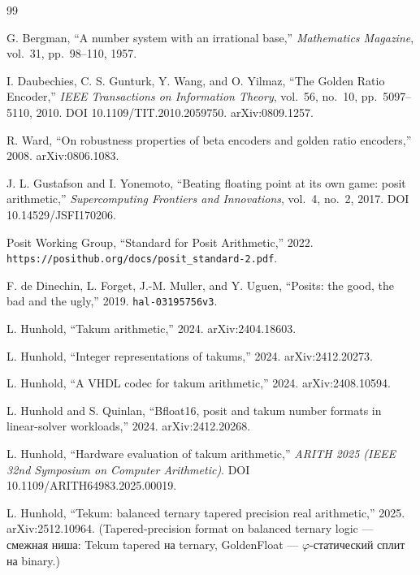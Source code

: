 \documentclass[11pt,a4paper]{article}
\theoremstyle{plain}
\begin{document}
\begin{thebibliography}{99}\small

 G. Bergman, ``A number system with an irrational base,''
\emph{Mathematics Magazine}, vol.~31, pp.~98--110, 1957.

 I. Daubechies, C. S. Gunturk, Y. Wang, and
O. Yilmaz, ``The Golden Ratio Encoder,'' \emph{IEEE Transactions on
Information Theory}, vol.~56, no.~10, pp.~5097--5110, 2010.
DOI 10.1109/TIT.2010.2059750. arXiv:0809.1257.

 R. Ward, ``On robustness properties of beta encoders and
golden ratio encoders,'' 2008. arXiv:0806.1083.

 J. L. Gustafson and I. Yonemoto, ``Beating
floating point at its own game: posit arithmetic,'' \emph{Supercomputing
Frontiers and Innovations}, vol.~4, no.~2, 2017.
DOI 10.14529/JSFI170206.

 Posit Working Group, ``Standard for Posit Arithmetic,''
2022. \texttt{https://posithub.org/docs/posit\_standard-2.pdf}.

 F. de Dinechin, L. Forget, J.-M. Muller, and Y.
Uguen, ``Posits: the good, the bad and the ugly,'' 2019.
\texttt{hal-03195756v3}.

 L. Hunhold, ``Takum arithmetic,'' 2024.
arXiv:2404.18603.

 L. Hunhold, ``Integer representations of takums,''
2024. arXiv:2412.20273.

 L. Hunhold, ``A VHDL codec for takum arithmetic,''
2024. arXiv:2408.10594.

 L. Hunhold and S. Quinlan, ``Bfloat16, posit and
takum number formats in linear-solver workloads,'' 2024. arXiv:2412.20268.

 L. Hunhold, ``Hardware evaluation of takum
arithmetic,'' \emph{ARITH 2025 (IEEE 32nd Symposium on Computer Arithmetic)}.
DOI 10.1109/ARITH64983.2025.00019.

 L. Hunhold, ``Tekum: balanced ternary tapered
precision real arithmetic,'' 2025. arXiv:2512.10964. (Tapered-precision
format on balanced ternary logic --- смежная ниша: Tekum tapered на
ternary, GoldenFloat --- \(\varphi\)-статический сплит на binary.)


\end{thebibliography}
\end{document}
